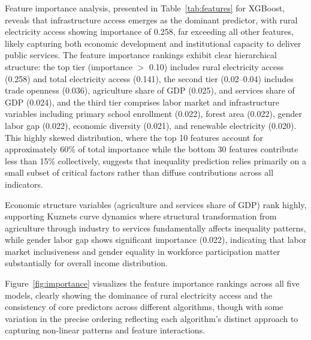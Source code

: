 \documentclass[10pt,twocolumn]{article}
\begin{document}
\begin{table}[H]
\caption{Model Performance Comparison}
\label{tab:performance}
\centering
\scriptsize

\end{table}

\begin{table}[H]
\caption{Top 10 Features by Importance (XGBoost)}
\label{tab:features}
\centering
\footnotesize

\end{table}

Feature importance analysis, presented in Table~\ref{tab:features} for XGBoost, reveals that infrastructure access emerges as the dominant predictor, with rural electricity access showing importance of 0.258, far exceeding all other features, likely capturing both economic development and institutional capacity to deliver public services. The feature importance rankings exhibit clear hierarchical structure: the top tier (importance $>$ 0.10) includes rural electricity access (0.258) and total electricity access (0.141), the second tier (0.02--0.04) includes trade openness (0.036), agriculture share of GDP (0.025), and services share of GDP (0.024), and the third tier comprises labor market and infrastructure variables including primary school enrollment (0.022), forest area (0.022), gender labor gap (0.022), economic diversity (0.021), and renewable electricity (0.020). This highly skewed distribution, where the top 10 features account for approximately 60\% of total importance while the bottom 30 features contribute less than 15\% collectively, suggests that inequality prediction relies primarily on a small subset of critical factors rather than diffuse contributions across all indicators.

Economic structure variables (agriculture and services share of GDP) rank highly, supporting Kuznets curve dynamics where structural transformation from agriculture through industry to services fundamentally affects inequality patterns, while gender labor gap shows significant importance (0.022), indicating that labor market inclusiveness and gender equality in workforce participation matter substantially for overall income distribution.

Figure~\ref{fig:importance} visualizes the feature importance rankings across all five models, clearly showing the dominance of rural electricity access and the consistency of core predictors across different algorithms, though with some variation in the precise ordering reflecting each algorithm's distinct approach to capturing non-linear patterns and feature interactions.
\end{document}
